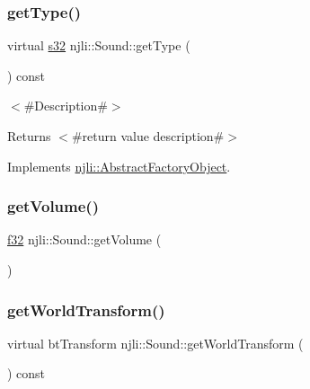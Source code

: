\mbox{\label{classnjli_1_1_sound_a4eb1275fcde09dd0bbefd6950fdd8fbd}} 
\subsubsection{\texorpdfstring{get\+Type()}{getType()}}
{\footnotesize\ttfamily virtual \mbox{\hyperlink{_util_8h_aa62c75d314a0d1f37f79c4b73b2292e2}{s32}} njli\+::\+Sound\+::get\+Type (\begin{DoxyParamCaption}{ }\end{DoxyParamCaption}) const\hspace{0.3cm}{\ttfamily [virtual]}}

$<$\#\+Description\#$>$

\begin{DoxyReturn}{Returns}
$<$\#return value description\#$>$ 
\end{DoxyReturn}


Implements \mbox{\hyperlink{classnjli_1_1_abstract_factory_object_a207c86146d40d0794708ae7f2d4e60a7}{njli\+::\+Abstract\+Factory\+Object}}.

\mbox{\label{classnjli_1_1_sound_ab765af304f9023b6aa75cea03893fa32}} 
\subsubsection{\texorpdfstring{get\+Volume()}{getVolume()}}
{\footnotesize\ttfamily \mbox{\hyperlink{_util_8h_a5f6906312a689f27d70e9d086649d3fd}{f32}} njli\+::\+Sound\+::get\+Volume (\begin{DoxyParamCaption}{ }\end{DoxyParamCaption})}

\mbox{\label{classnjli_1_1_sound_ac6e54aa0ca0c4e9893d9a78322f86dd3}} 
\subsubsection{\texorpdfstring{get\+World\+Transform()}{getWorldTransform()}}
{\footnotesize\ttfamily virtual bt\+Transform njli\+::\+Sound\+::get\+World\+Transform (\begin{DoxyParamCaption}{ }\end{DoxyParamCaption}) const\hspace{0.3cm}{\ttfamily [virtual]}}

